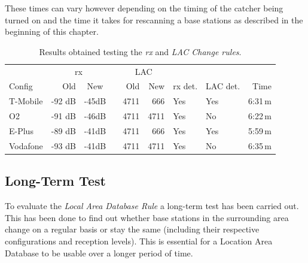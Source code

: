 These times can vary however depending on the timing of the catcher being turned on and the time it takes for rescanning a base stations as described in the beginning of this chapter.
\begin{table}
\centering
\begin{tabular}{lrcrrrllr}
\toprule
			&\multicolumn{2}{c}{rx}		&\phantom{a}	&\multicolumn{2}{c}{LAC}	&				&	&		\\
			\cmidrule{2-3} 								\cmidrule{5-6} 
Config 		&Old	&New				&				&Old	&New				&rx det.	&LAC det.		&Time\\
\midrule
T-Mobile	&-92 dB	&-45dB				&				&4711	&666				&Yes		&Yes	&6:31\,m\\
O2			&-91 dB	&-46dB				&				&4711	&4711				&Yes		&No		&6:22\,m\\
E-Plus		&-89 dB	&-41dB				&				&4711	&666				&Yes		&Yes	&5:59\,m\\
Vodafone	&-93 dB	&-41dB				&				&4711	&4711				&Yes		&No		&6:35\,m\\
\bottomrule
\end{tabular}
\caption{Results obtained testing the \emph{rx} and \emph{LAC Change rules}.}
\label{tab:par_change}
\end{table}

\subsection{Long-Term Test}
To evaluate the \emph{Local Area Database Rule} a long-term test has been carried out.
This has been done to find out whether base stations in the surrounding area change on a regular basis or stay the same (including their respective configurations and reception levels).
This is essential for a Location Area Database to be usable over a longer period of time.


